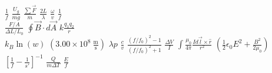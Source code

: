 \documentclass{article}
\begin{document}
\begin{landscape}
\begin{center}
\begin{Large}

$\frac{1}{f}$
$\frac{U_g}{mg}$
$\frac{\sum \vec F}{m}$
$\frac{2L}{\lambda}$
$\frac{\omega}{v}$
$\frac{1}{f}$ \\
\vspace{20pt}
$\frac{F/A}{\Delta L/L_0}$
$\oint \vec B \cdot d\vec A$
$k \frac{q_1 q_2}{r}$ \\
\vspace{20pt}
$k_B \ln(w)$
$(3.00 \times 10^8~\mathrm{\frac m s})$
$\lambda p$
$\frac{c}{v}$
$\frac{(f/f_0)^2 - 1}{(f/f_0)^2 + 1}$
$\frac{\Delta V}{I}$
$\int\frac{\mu_0}{4\pi} \frac{I d\vec l \times \hat r}{r^2}$
$(\frac 1 2 \epsilon_0 E^2 + \frac{B^2}{2\mu_0})$
$\left[ \frac{1}{f} - \frac{1}{s'} \right]^{-1}$
$\frac{Q}{m \Delta T}$
$\frac{E}{f}$

\end{Large}
\end{center}
\end{landscape}
\end{document}
